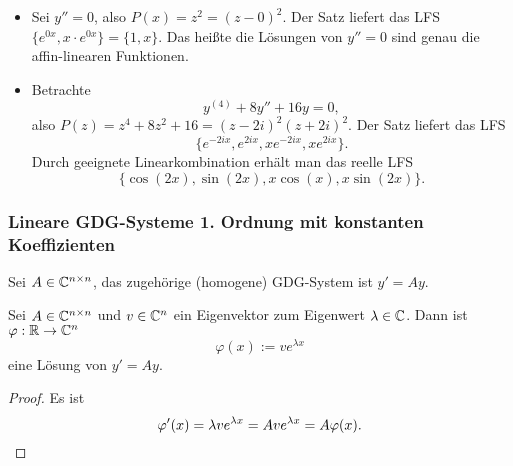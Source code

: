 \begin{exmp}
  \begin{itemize}
  \item Sei $y''=0$, also $P(x) = z^2 = (z-0)^2$. Der Satz liefert das LFS
    $\{e^{0x},x \cdot e^{0x}\} = \{ 1, x\}$. Das heißte die Lösungen von $y'' =
    0$ sind genau die affin-linearen Funktionen.
  \item Betrachte
    \[ y^{(4)} + 8 y'' + 16y = 0, \]
    also $P(z) = z^4 + 8 z^2 + 16 = (z-2i)^2(z+2i)^2$. Der Satz liefert das LFS
    \[ \{ e^{-2ix}, e^{2ix}, xe^{-2ix}, xe^{2ix} \}. \]
    Durch geeignete Linearkombination erhält man das reelle LFS
    \[ \{ \cos(2x), \sin(2x), x \cos(x), x \sin(2x) \}. \]
  \end{itemize}
\end{exmp}

\subsubsection{Lineare GDG-Systeme 1. Ordnung mit konstanten Koeffizienten}
Sei $A \in \mathbb{C}^{n \times n}$, das zugehörige (homogene) GDG-System ist $y' =
Ay$.

\begin{rmrk}
  Sei $A \in \mathbb{C}^{n \times n}$ und $v \in \mathbb{C}^n$ ein Eigenvektor zum
  Eigenwert $\lambda \in \mathbb{C}$. Dann ist $\varphi:\mathbb{R} \to \mathbb{C}^n$
  \[ \varphi(x) := v e^{\lambda x} \]
  eine Lösung von $y' = Ay$.
\end{rmrk}

\begin{proof}
  Es ist
  \[ \varphi'(x) = \lambda v e^{\lambda x} = A v e^{\lambda x} = A \varphi(x).
    \qedhere \]
\end{proof}

